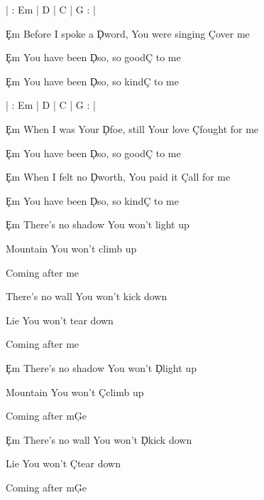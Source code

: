 \documentclass[9pt]{extarticle}
\begin{document}
\bsong

\bi
| : Em | D | C | G : |
\ei

\bv
\c{Em} Before I spoke a \c{D}word, You were singing \c{C}over me

\c{Em} You have been \c{D}so, so good\c{C} to me


\c{Em} You have been \c{D}so, so kind\c{C} to me
\ev

\bc
{}



\ec

\bin
| : Em | D | C | G : |
\ein

\bv
\c{Em} When I was Your \c{D}foe, still Your love \c{C}fought for me

\c{Em} You have been \c{D}so, so good\c{C} to me

\c{Em} When I felt no \c{D}worth, You paid it \c{C}all for me

\c{Em} You have been \c{D}so, so kind\c{C} to me
\ev



\bb
\c{Em} There's no shadow You won't light up

Mountain You won't climb up

Coming after me

There's no wall You won't kick down

Lie You won't tear down

Coming after me
\eb

\bb[2]
\c{Em} There's no shadow You won't \c{D}light up

Mountain You won't \c{C}climb up

Coming after m\c{G}e

\c{Em} There's no wall You won't \c{D}kick down

Lie You won't \c{C}tear down

Coming after m\c{G}e
\eb


\esong
\end{document}
